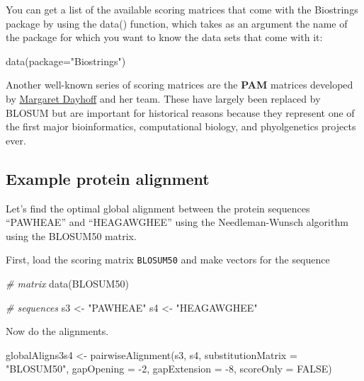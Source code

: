 \documentclass[
]{book}
\newenvironment{Shaded}{\begin{snugshade}}{\end{snugshade}}
\newcommand{\AttributeTok}[1]{\textcolor[rgb]{0.77,0.63,0.00}{#1}}
\newcommand{\CommentTok}[1]{\textcolor[rgb]{0.56,0.35,0.01}{\textit{#1}}}
\newcommand{\ConstantTok}[1]{\textcolor[rgb]{0.00,0.00,0.00}{#1}}
\newcommand{\DecValTok}[1]{\textcolor[rgb]{0.00,0.00,0.81}{#1}}
\newcommand{\FunctionTok}[1]{\textcolor[rgb]{0.00,0.00,0.00}{#1}}
\newcommand{\NormalTok}[1]{#1}
\newcommand{\OtherTok}[1]{\textcolor[rgb]{0.56,0.35,0.01}{#1}}
\newcommand{\SpecialCharTok}[1]{\textcolor[rgb]{0.00,0.00,0.00}{#1}}
\newcommand{\StringTok}[1]{\textcolor[rgb]{0.31,0.60,0.02}{#1}}
\begin{document}
You can get a list of the available scoring matrices that come with the Biostrings package by using the data() function, which takes as an argument the name of the package for which you want to know the data sets that come with it:

\begin{Shaded}
\begin{Highlighting}[]
\FunctionTok{data}\NormalTok{(}\AttributeTok{package=}\StringTok{"Biostrings"}\NormalTok{)}
\end{Highlighting}
\end{Shaded}

Another well-known series of scoring matrices are the \textbf{PAM} matrices developed by \href{https://en.wikipedia.org/wiki/Margaret_Oakley_Dayhoff}{Margaret Dayhoff} and her team. These have largely been replaced by BLOSUM but are important for historical reasons because they represent one of the first major bioinformatics, computational biology, and phyolgenetics projects ever.

\hypertarget{example-protein-alignment}{%
\subsection{Example protein alignment}\label{example-protein-alignment}}

Let's find the optimal global alignment between the protein sequences ``PAWHEAE'' and ``HEAGAWGHEE'' using the Needleman-Wunsch algorithm using the BLOSUM50 matrix.

First, load the scoring matrix \texttt{BLOSUM50} and make vectors for the sequence

\begin{Shaded}
\begin{Highlighting}[]
\CommentTok{\# matrix}
\FunctionTok{data}\NormalTok{(BLOSUM50)}

\CommentTok{\# sequences}
\NormalTok{s3 }\OtherTok{\textless{}{-}} \StringTok{"PAWHEAE"}
\NormalTok{s4 }\OtherTok{\textless{}{-}} \StringTok{"HEAGAWGHEE"}
\end{Highlighting}
\end{Shaded}

Now do the alignments.

\begin{Shaded}
\begin{Highlighting}[]
\NormalTok{globalAligns3s4 }\OtherTok{\textless{}{-}} \FunctionTok{pairwiseAlignment}\NormalTok{(s3, s4,}
                                     \AttributeTok{substitutionMatrix =} \StringTok{"BLOSUM50"}\NormalTok{, }
                                     \AttributeTok{gapOpening =} \SpecialCharTok{{-}}\DecValTok{2}\NormalTok{,}
                                     \AttributeTok{gapExtension =} \SpecialCharTok{{-}}\DecValTok{8}\NormalTok{, }
                                     \AttributeTok{scoreOnly =} \ConstantTok{FALSE}\NormalTok{)}
\end{Highlighting}
\end{Shaded}
\end{document}
